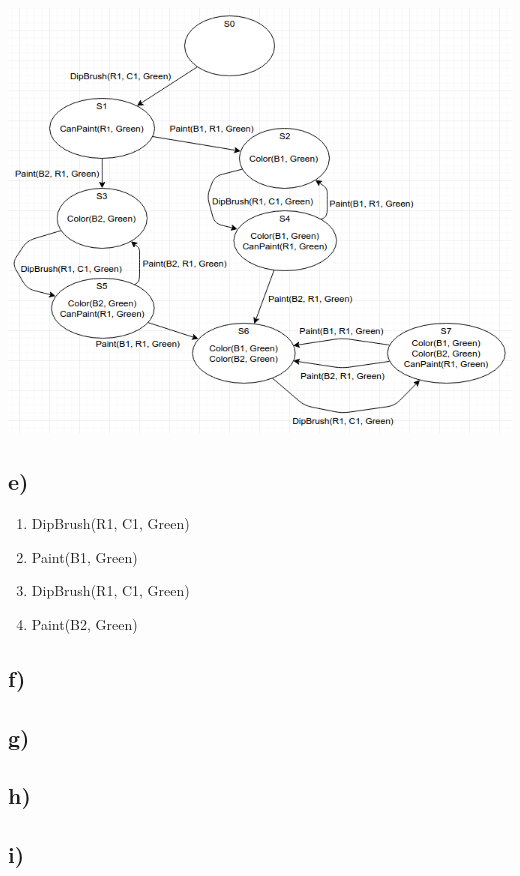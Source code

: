 \documentclass[12pt]{article}
\begin{document}
\includegraphics[scale=0.6]{statespace.png}

\subsection*{e)}
\label{sub:e)}

\begin{enumerate}
    \item DipBrush(R1, C1, Green)
    \item Paint(B1, Green)
    \item DipBrush(R1, C1, Green)
    \item Paint(B2, Green)
\end{enumerate}

\subsection*{f)}
\label{sub:f)}

\subsection*{g)}
\label{sub:g)}

\subsection*{h)}
\label{sub:h)}

\subsection*{i)}
\label{sub:i)}
\end{document}
